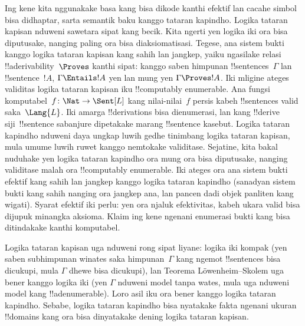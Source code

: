 \documentclass[../../../include/open-logic-section]{subfiles}
\begin{document}


Ing kene kita nggunakake basa kang bisa dikode kanthi efektif lan cacahe simbol bisa didhaptar, sarta semantik baku kanggo tataran kapindho. Logika tataran kapisan nduweni sawetara sipat kang becik. Kita
ngerti yen logika iki ora bisa diputusake, nanging paling ora
bisa diaksiomatisasi. Tegese, ana sistem bukti kanggo logika
tataran kapisan kang sahih lan jangkep, yaiku ngasilake relasi
!!a{derivability}~$\Proves$ kanthi sipat: kanggo saben
himpunan !!{sentence}s~$\Gamma$ lan !!{sentence}~$!A$,
$\Gamma \Entails !A$ yen lan mung yen
$\Gamma \Proves !A$. Iki mligine ateges validitas logika
tataran kapisan iku !!{computably
  enumerable}. Ana fungsi komputabel~$f\colon \Nat \to
\Sent[L]$ kang nilai-nilai~$f$ persis kabeh !!{sentence}s valid
saka~$\Lang{L}$. Iki amarga !!{derivation}s bisa
dienumerasi, lan kang !!{derive} siji~!!{sentence}
sabanjure dipetakake marang !!{sentence} kasebut.
Logika tataran kapindho nduweni daya ungkap luwih gedhe tinimbang
logika tataran kapisan, mula umume luwih ruwet kanggo nemtokake
validitase. Sejatine, kita bakal nuduhake yen logika tataran
kapindho ora mung ora bisa diputusake, nanging validitase
malah ora !!{computably
  enumerable}. Iki ateges ora ana sistem bukti efektif kang sahih
lan jangkep kanggo logika tataran kapindho (sanadyan sistem
bukti kang sahih nanging ora jangkep ana, lan pancen dadi
objek panliten kang wigati). Syarat efektif iki perlu: yen ora njaluk efektivitas, kabeh ukara valid bisa dijupuk minangka aksioma. Klaim ing kene ngenani enumerasi bukti kang bisa ditindakake kanthi komputabel.

Logika tataran kapisan uga nduweni rong sipat liyane: logika iki
kompak (yen saben subhimpunan winates saka himpunan~$\Gamma$
kang ngemot !!{sentence}s bisa dicukupi, mula $\Gamma$
dhewe bisa dicukupi), lan Teorema L\"owenheim--Skolem
uga bener kanggo logika iki (yen $\Gamma$ nduweni model tanpa wates,
mula uga nduweni model kang !!a{denumerable}). Loro asil iku
ora bener kanggo logika tataran kapindho. Sebabe, logika
tataran kapindho bisa nyatakake fakta ngenani ukuran
!!{domain}s kang ora bisa dinyatakake dening logika tataran
kapisan.
\end{document}
